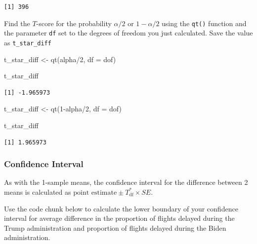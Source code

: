 \documentclass[
  letterpaper,
  DIV=11,
  numbers=noendperiod]{scrartcl}
\newenvironment{Shaded}{\begin{snugshade}}{\end{snugshade}}
\newcommand{\AttributeTok}[1]{\textcolor[rgb]{0.40,0.45,0.13}{#1}}
\newcommand{\DecValTok}[1]{\textcolor[rgb]{0.68,0.00,0.00}{#1}}
\newcommand{\FunctionTok}[1]{\textcolor[rgb]{0.28,0.35,0.67}{#1}}
\newcommand{\NormalTok}[1]{\textcolor[rgb]{0.00,0.23,0.31}{#1}}
\newcommand{\OtherTok}[1]{\textcolor[rgb]{0.00,0.23,0.31}{#1}}
\newcommand{\SpecialCharTok}[1]{\textcolor[rgb]{0.37,0.37,0.37}{#1}}
\begin{document}
\begin{verbatim}
[1] 396
\end{verbatim}

Find the \(T\)-score for the probability \(\alpha/2\) or \(1-\alpha/2\)
using the \texttt{qt()} function and the parameter \texttt{df} set to
the degrees of freedom you just calculated. Save the value as
\texttt{t\_star\_diff}

\begin{Shaded}
\begin{Highlighting}[]
\NormalTok{t\_star\_diff }\OtherTok{\textless{}{-}} \FunctionTok{qt}\NormalTok{(alpha}\SpecialCharTok{/}\DecValTok{2}\NormalTok{, }
                  \AttributeTok{df =}\NormalTok{ dof)}

\NormalTok{t\_star\_diff}
\end{Highlighting}
\end{Shaded}

\begin{verbatim}
[1] -1.965973
\end{verbatim}

\begin{Shaded}
\begin{Highlighting}[]
\NormalTok{t\_star\_diff }\OtherTok{\textless{}{-}} \FunctionTok{qt}\NormalTok{(}\DecValTok{1}\SpecialCharTok{{-}}\NormalTok{alpha}\SpecialCharTok{/}\DecValTok{2}\NormalTok{, }
                  \AttributeTok{df =}\NormalTok{ dof)}

\NormalTok{t\_star\_diff}
\end{Highlighting}
\end{Shaded}

\begin{verbatim}
[1] 1.965973
\end{verbatim}

\subsubsection{Confidence Interval}\label{confidence-interval-3}

As with the 1-sample means, the confidence interval for the difference
between 2 means is calculated as
\(\text{point estimate} \pm T^*_{\text{df}} \times SE\).

Use the code chunk below to calculate the lower boundary of your
confidence interval for average difference in the proportion of flights
delayed during the Trump administration and proportion of flights
delayed during the Biden administration.
\end{document}
